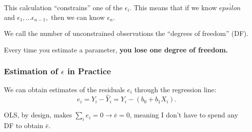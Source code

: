 \documentclass[12pt]{notes}
\begin{document}
\nspace
This calculation ``constrains'' one of the $\epsilon_i$. This means that if we know $\bar{epsilon}$ and $\epsilon_1, \ldots \epsilon_{n-1},$ then we can know $\epsilon_n$. 

\nspace
We call the number of unconstrained observations the ``degrees of freedom'' (DF). 

\nspace
Every time you estimate a parameter, \textbf{you lose one degree of freedom.}

\begin{minipage}[l][2cm][c]{\textwidth}

\end{minipage}

\subsubsection*{Estimation of $\epsilon$ in Practice}


\begin{minipage}[l][2cm][c]{\textwidth}

\end{minipage}

We can obtain estimates of the residuals $e_i$ through the regression line: 
\[
e_i = Y_i - \hat{Y}_i = Y_i - (b_0 + b_1X_i).
\]

\nspace
OLS, by design, makes $\sum_ie_i = 0 \rightarrow \bar{e} = 0$, meaning I don't have to spend any DF to obtain $\bar{e}$. 


\begin{minipage}[l][2cm][c]{\textwidth}

\end{minipage}
\end{document}
